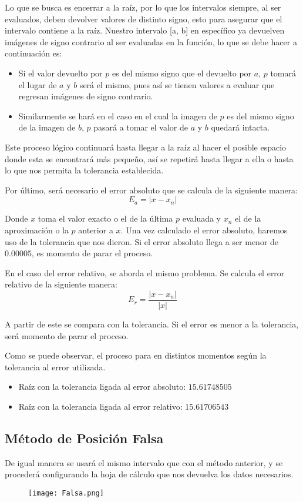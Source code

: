 \documentclass{article}
\begin{document}
Lo que se busca es encerrar a la raíz, por lo que los intervalos siempre, al ser evaluados, deben devolver valores de distinto signo, esto para asegurar que el intervalo contiene a la raíz. Nuestro intervalo [a, b] en específico ya devuelven imágenes de signo contrario al ser evaluadas en la función, lo que se debe hacer a continuación es:

\begin{itemize}
    \item Si el valor devuelto por \(p\) es del mismo signo que el devuelto por \(a\), \(p\) tomará el lugar de \(a\) y \(b\) será el mismo, pues así se tienen valores a evaluar que regresan imágenes de signo contrario.
    \item Similarmente se hará en el caso en el cual la imagen de \(p\) es del mismo signo de la imagen de \(b\), \(p\) pasará a tomar el valor de \(a\) y \(b\) quedará intacta.
\end{itemize}

Este proceso lógico continuará hasta llegar a la raíz al hacer el posible espacio donde esta se encontrará más pequeño, así se repetirá hasta llegar a ella o hasta lo que nos permita la tolerancia establecida.

Por último, será necesario el error absoluto que se calcula de la siguiente manera:
\[E_a = |x - x_n|\]

Donde \(x\) toma el valor exacto o el de la última \(p\) evaluada y \(x_n\) el de la aproximación o la \(p\) anterior a \(x\). Una vez calculado el error absoluto, haremos uso de la tolerancia que nos dieron. Si el error absoluto llega a ser menor de \(0.00005\), es momento de parar el proceso.

En el caso del error relativo, se aborda el mismo problema. Se calcula el error relativo de la siguiente manera:
\[E_r = \frac{|x - x_n|}{|x|}\]

A partir de este se compara con la tolerancia. Si el error es menor a la tolerancia, será momento de parar el proceso.

Como se puede observar, el proceso para en distintos momentos según la tolerancia al error utilizada.
\begin{itemize}
    \item Raíz con la tolerancia ligada al error absoluto: \(15.61748505\)
    \item Raíz con la tolerancia ligada al error relativo: \(15.61706543\)
\end{itemize}

\subsection{Método de Posición Falsa}
De igual manera se usará el mismo intervalo que con el método anterior, y se procederá configurando la hoja de cálculo que nos devuelva los datos necesarios.
\\
\begin{figure}[h]
    \raggedleft
    \texttt{[image: Falsa.png]}
    \end{figure}
\end{document}

